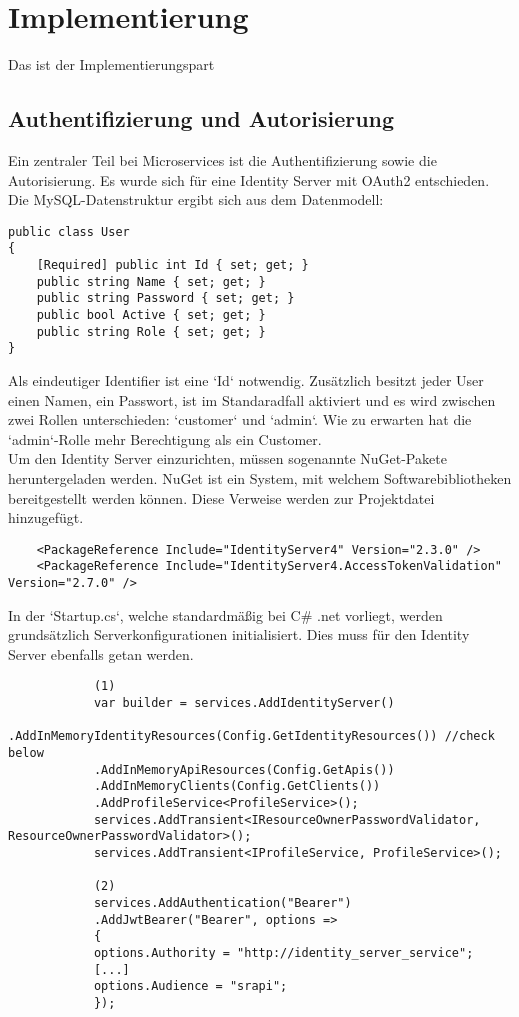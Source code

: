 \section{Implementierung}
Das ist der Implementierungspart

\subsection{Authentifizierung und Autorisierung}
Ein zentraler Teil bei Microservices ist die Authentifizierung sowie die Autorisierung. Es wurde sich für eine Identity Server mit OAuth2 entschieden. Die MySQL-Datenstruktur ergibt sich aus dem Datenmodell:

\begin{verbatim}
public class User
{
	[Required] public int Id { set; get; }
	public string Name { set; get; }
	public string Password { set; get; }
	public bool Active { set; get; }
	public string Role { set; get; }
}
\end{verbatim}

Als eindeutiger Identifier ist eine `Id` notwendig. Zusätzlich besitzt jeder User einen Namen, ein Passwort, ist im Standaradfall aktiviert und es wird zwischen zwei Rollen unterschieden: `customer` und  `admin`. Wie zu erwarten hat die `admin`-Rolle mehr Berechtigung als ein Customer. \\

Um den Identity Server einzurichten, müssen sogenannte NuGet-Pakete heruntergeladen werden. NuGet ist ein System, mit welchem Softwarebibliotheken bereitgestellt werden können. Diese Verweise werden zur Projektdatei hinzugefügt.

\begin{verbatim}
    <PackageReference Include="IdentityServer4" Version="2.3.0" />
	<PackageReference Include="IdentityServer4.AccessTokenValidation" Version="2.7.0" />
\end{verbatim}

In der `Startup.cs`, welche standardmäßig bei C\# .net vorliegt, werden grundsätzlich Serverkonfigurationen initialisiert. Dies muss für den Identity Server ebenfalls getan werden.

\begin{verbatim}
			(1)
            var builder = services.AddIdentityServer()
			.AddInMemoryIdentityResources(Config.GetIdentityResources()) //check below
			.AddInMemoryApiResources(Config.GetApis())
			.AddInMemoryClients(Config.GetClients())
			.AddProfileService<ProfileService>();
			services.AddTransient<IResourceOwnerPasswordValidator, ResourceOwnerPasswordValidator>();
			services.AddTransient<IProfileService, ProfileService>();
						
			(2)
			services.AddAuthentication("Bearer")
			.AddJwtBearer("Bearer", options =>
			{
			options.Authority = "http://identity_server_service";
			[...]
			options.Audience = "srapi";
			});
\end{verbatim}  

